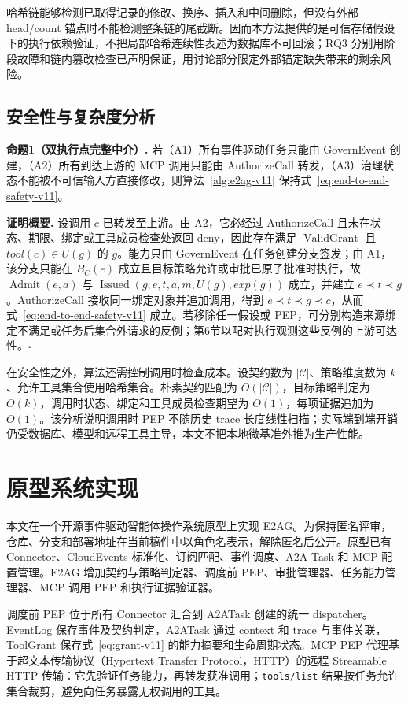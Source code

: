 哈希链能够检测已取得记录的修改、换序、插入和中间删除，但没有外部 head/count 锚点时不能检测整条链的尾截断。因而本方法提供的是可信存储假设下的执行依赖验证，不把局部哈希连续性表述为数据库不可回滚；RQ3 分别用阶段故障和链内篡改检查已声明保证，用讨论部分限定外部锚定缺失带来的剩余风险。

\subsection{安全性与复杂度分析}

\noindent\textbf{命题1（双执行点完整中介）.}
若（A1）所有事件驱动任务只能由 GovernEvent 创建，（A2）所有到达上游的 MCP 调用只能由 AuthorizeCall 转发，（A3）治理状态不能被不可信输入方直接修改，则算法~\ref{alg:e2ag-v11} 保持式~\eqref{eq:end-to-end-safety-v11}。

\noindent\textbf{证明概要.}
设调用 $c$ 已转发至上游。由 A2，它必经过 AuthorizeCall 且未在状态、期限、绑定或工具成员检查处返回 deny，因此存在满足 $\operatorname{ValidGrant}$ 且 $tool(c)\in U(g)$ 的 $g$。能力只由 GovernEvent 在任务创建分支签发；由 A1，该分支只能在 $B_C(e)$ 成立且目标策略允许或审批已原子批准时执行，故 $\operatorname{Admit}(e,a)$ 与 $\operatorname{Issued}(g,e,t,a,m,U(g),exp(g))$ 成立，并建立 $e\prec t\prec g$。AuthorizeCall 接收同一绑定对象并追加调用，得到 $e\prec t\prec g\prec c$，从而式~\eqref{eq:end-to-end-safety-v11} 成立。若移除任一假设或 PEP，可分别构造来源绑定不满足或任务后集合外请求的反例；第6节以配对执行观测这些反例的上游可达性。\hfill$\square$

在安全性之外，算法还需控制调用时检查成本。设契约数为 $|\mathcal{C}|$、策略维度数为 $k$、允许工具集合使用哈希集合。朴素契约匹配为 $O(|\mathcal{C}|)$，目标策略判定为 $O(k)$，调用时状态、绑定和工具成员检查期望为 $O(1)$，每项证据追加为 $O(1)$。该分析说明调用时 PEP 不随历史 trace 长度线性扫描；实际端到端开销仍受数据库、模型和远程工具主导，本文不把本地微基准外推为生产性能。

\section{原型系统实现}\label{sec:implementation-v11}

本文在一个开源事件驱动智能体操作系统原型上实现 E2AG。为保持匿名评审，仓库、分支和部署地址在当前稿件中以角色名表示，解除匿名后公开。原型已有 Connector、CloudEvents 标准化、订阅匹配、事件调度、A2A Task 和 MCP 配置管理。E2AG 增加契约与策略判定器、调度前 PEP、审批管理器、任务能力管理器、MCP 调用 PEP 和执行证据验证器。

调度前 PEP 位于所有 Connector 汇合到 A2ATask 创建的统一 dispatcher。EventLog 保存事件及契约判定，A2ATask 通过 context 和 trace 与事件关联，ToolGrant 保存式~\eqref{eq:grant-v11} 的能力摘要和生命周期状态。MCP PEP 代理基于超文本传输协议（Hypertext Transfer Protocol，HTTP）的远程 Streamable HTTP 传输：它先验证任务能力，再转发获准调用；\texttt{tools/list} 结果按任务允许集合裁剪，避免向任务暴露无权调用的工具。

